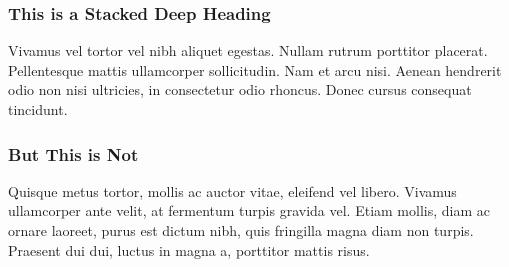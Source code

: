 \stack

\subsubsection{This is a Stacked Deep Heading}

Vivamus vel tortor vel nibh aliquet egestas. Nullam rutrum porttitor placerat.
Pellentesque mattis ullamcorper sollicitudin. Nam et arcu nisi. Aenean hendrerit
odio non nisi ultricies, in consectetur odio rhoncus. Donec cursus consequat
tincidunt.

\subsubsection{But This is Not}

Quisque metus tortor, mollis ac auctor vitae, eleifend vel libero. Vivamus
ullamcorper ante velit, at fermentum turpis gravida vel. Etiam mollis, diam ac
ornare laoreet, purus est dictum nibh, quis fringilla magna diam non turpis.
Praesent dui dui, luctus in magna a, porttitor mattis risus.

